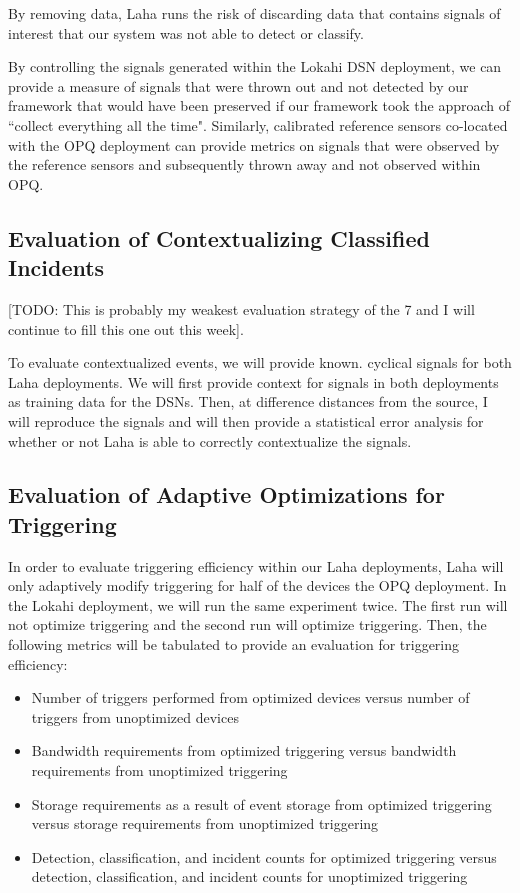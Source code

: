 By removing data, Laha runs the risk of discarding data that contains signals of interest that our system was not able to detect or classify. 

By controlling the signals generated within the Lokahi DSN deployment, we can provide a measure of signals that were thrown out and not detected by our framework that would have been preserved if our framework took the approach of ``collect everything all the time". Similarly, calibrated reference sensors co-located with the OPQ deployment can provide metrics on signals that were observed by the reference sensors and subsequently thrown away and not observed within OPQ.

\subsection{Evaluation of Contextualizing Classified Incidents}
[TODO: This is probably my weakest evaluation strategy of the 7 and I will continue to fill this one out this week].

To evaluate contextualized events, we will provide known. cyclical signals for both Laha deployments. We will first provide context for signals in both deployments as training data for the DSNs. Then, at difference distances from the source, I will reproduce the signals and will then provide a statistical error analysis for whether or not Laha is able to correctly contextualize the signals.

\subsection{Evaluation of Adaptive Optimizations for Triggering}
In order to evaluate triggering efficiency within our Laha deployments, Laha will only adaptively modify triggering for half of the devices the OPQ deployment. In the Lokahi deployment, we will run the same experiment twice. The first run will not optimize triggering and the second run will optimize triggering. Then, the following metrics will be tabulated to provide an evaluation for triggering efficiency:

\begin{itemize}
	\item Number of triggers performed from optimized devices versus number of triggers from  unoptimized devices
	\item Bandwidth requirements from optimized triggering versus bandwidth requirements from unoptimized triggering
	\item Storage requirements as a result of event storage from optimized triggering versus storage requirements from unoptimized triggering
	\item Detection, classification, and incident counts for optimized triggering versus detection, classification, and incident counts for unoptimized triggering
\end{itemize}

